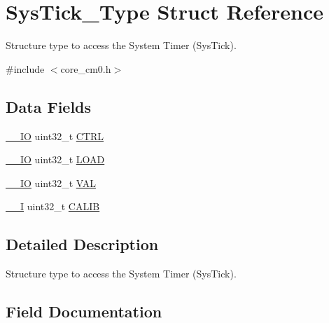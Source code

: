 \hypertarget{struct_sys_tick___type}{}\section{Sys\+Tick\+\_\+\+Type Struct Reference}
\label{struct_sys_tick___type}


Structure type to access the System Timer (Sys\+Tick).  




{\ttfamily \#include $<$core\+\_\+cm0.\+h$>$}

\subsection*{Data Fields}
\begin{DoxyCompactItemize}
\item 
\mbox{\hyperlink{core__sc300_8h_aec43007d9998a0a0e01faede4133d6be}{\+\_\+\+\_\+\+IO}} uint32\+\_\+t \mbox{\hyperlink{struct_sys_tick___type_a15fc8d35f045f329b80c544bef35ff64}{C\+T\+RL}}
\item 
\mbox{\hyperlink{core__sc300_8h_aec43007d9998a0a0e01faede4133d6be}{\+\_\+\+\_\+\+IO}} uint32\+\_\+t \mbox{\hyperlink{struct_sys_tick___type_aad9adf4efc940cddb8161b69cfbe19d3}{L\+O\+AD}}
\item 
\mbox{\hyperlink{core__sc300_8h_aec43007d9998a0a0e01faede4133d6be}{\+\_\+\+\_\+\+IO}} uint32\+\_\+t \mbox{\hyperlink{struct_sys_tick___type_a26fb318c3b0a0ec7f45daafd5f8799a3}{V\+AL}}
\item 
\mbox{\hyperlink{core__sc300_8h_af63697ed9952cc71e1225efe205f6cd3}{\+\_\+\+\_\+I}} uint32\+\_\+t \mbox{\hyperlink{struct_sys_tick___type_a40e07d0a4638a676780713b6ceeec4ef}{C\+A\+L\+IB}}
\end{DoxyCompactItemize}


\subsection{Detailed Description}
Structure type to access the System Timer (Sys\+Tick). 

\subsection{Field Documentation}
\mbox{\label{struct_sys_tick___type_a40e07d0a4638a676780713b6ceeec4ef}} 
